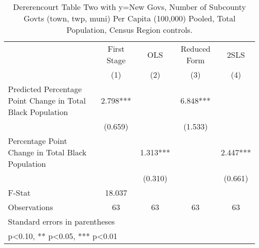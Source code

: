 \begin{table}[htbp]\centering
\def\sym#1{\ifmmode^{#1}\else\(^{#1}\)\fi}
\caption{Dererencourt Table Two with y=New Govs, Number of Subcounty Govts (town, twp, muni) Per Capita (100,000) Pooled, Total Population, Census Region controls.}
\begin{tabular}{l*{4}{c}}
\toprule
                    & First Stage   &         OLS   &Reduced Form   &        2SLS   \\
                    &\multicolumn{1}{c}{(1)}   &\multicolumn{1}{c}{(2)}   &\multicolumn{1}{c}{(3)}   &\multicolumn{1}{c}{(4)}   \\
\midrule
Predicted Percentage Point Change in Total Black Population&       2.798***&               &       6.848***&               \\
                    &     (0.659)   &               &     (1.533)   &               \\
\addlinespace
Percentage Point Change in Total Black Population&               &       1.313***&               &       2.447***\\
                    &               &     (0.310)   &               &     (0.661)   \\
\midrule
F-Stat              &      18.037   &               &               &               \\
Observations        &          63   &          63   &          63   &          63   \\
\bottomrule
\multicolumn{5}{l}{\footnotesize Standard errors in parentheses}\\
\multicolumn{5}{l}{\footnotesize * p<0.10, ** p<0.05, *** p<0.01}\\
\end{tabular}
\end{table}
